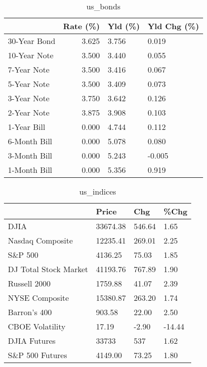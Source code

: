\documentclass{article}%
\begin{document}
%


\begin{table}[htbp]%
\caption{us\_bonds}%
\centering%
\begin{adjustbox}{width=1\textwidth}%
\begin{tabular}{lrll}
\toprule
             &  Rate (\%) & Yld (\%) & Yld Chg (\%) \\
\midrule
30-Year Bond &     3.625 &   3.756 &       0.019 \\
10-Year Note &     3.500 &   3.440 &       0.055 \\
 7-Year Note &     3.500 &   3.416 &       0.067 \\
 5-Year Note &     3.500 &   3.409 &       0.073 \\
 3-Year Note &     3.750 &   3.642 &       0.126 \\
 2-Year Note &     3.875 &   3.908 &       0.103 \\
 1-Year Bill &     0.000 &   4.744 &       0.112 \\
6-Month Bill &     0.000 &   5.078 &       0.080 \\
3-Month Bill &     0.000 &   5.243 &      -0.005 \\
1-Month Bill &     0.000 &   5.356 &       0.919 \\
\bottomrule
\end{tabular}
%
\end{adjustbox}%
\end{table}

%


\begin{table}[htbp]%
\caption{us\_indices}%
\centering%
\begin{adjustbox}{width=1\textwidth}%
\begin{tabular}{llll}
\toprule
                      &    Price &    Chg &   \%Chg \\
\midrule
                 DJIA & 33674.38 & 546.64 &   1.65 \\
     Nasdaq Composite & 12235.41 & 269.01 &   2.25 \\
              S\&P 500 &  4136.25 &  75.03 &   1.85 \\
DJ Total Stock Market & 41193.76 & 767.89 &   1.90 \\
         Russell 2000 &  1759.88 &  41.07 &   2.39 \\
       NYSE Composite & 15380.87 & 263.20 &   1.74 \\
         Barron's 400 &   903.58 &  22.00 &   2.50 \\
      CBOE Volatility &    17.19 &  -2.90 & -14.44 \\
         DJIA Futures &    33733 &    537 &   1.62 \\
      S\&P 500 Futures &  4149.00 &  73.25 &   1.80 \\
\bottomrule
\end{tabular}
%
\end{adjustbox}%
\end{table}
\end{document}
